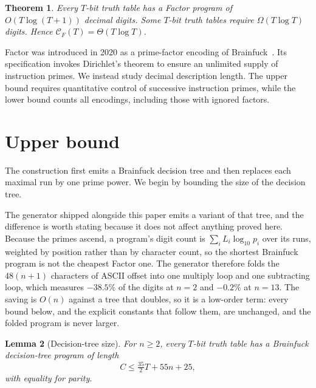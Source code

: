 \documentclass[11pt]{article}
\newtheorem{theorem}{Theorem}[section]
\newtheorem{lemma}[theorem]{Lemma}
\theoremstyle{remark}
\newcommand{\CF}{\mathcal C_F}
\begin{document}
\begin{theorem}\label{thm:main}
Every $T$-bit truth table has a Factor program of
$O(T\log(T+1))$ decimal digits.  Some $T$-bit truth tables require
$\Omega(T\log T)$ digits.  Hence $\CF(T)=\Theta(T\log T)$.
\end{theorem}

Factor was introduced in 2020 as a prime-factor encoding of
Brainfuck~\cite{factor-spec}.  Its specification invokes Dirichlet's theorem
to ensure an unlimited supply of instruction primes.  We instead study
decimal description length.  The upper bound requires quantitative control
of successive instruction primes, while the lower bound counts all encodings,
including those with ignored factors.

\section{Upper bound}

The construction first emits a Brainfuck decision tree and then replaces each
maximal run by one prime power.  We begin by bounding the size of the decision
tree.

The generator shipped alongside this paper emits a variant of that tree, and
the difference is worth stating because it does not affect anything proved
here.  Because the primes ascend, a program's digit count is
$\sum_i L_i\log_{10}p_i$ over its runs, weighted by position rather than by
character count, so the shortest Brainfuck program is not the cheapest Factor
one.  The generator therefore folds the $48(n+1)$ characters of ASCII offset
into one multiply loop and one subtracting loop, which measures $-38.5\%$ of
the digits at $n=2$ and $-0.2\%$ at $n=13$.  The saving is $O(n)$ against a
tree that doubles, so it is a low-order term: every bound below, and the
explicit constants that follow them, are unchanged, and the folded program is
never larger.

\begin{lemma}[Decision-tree size]\label{lem:tree}
For $n\ge2$, every $T$-bit truth table has a Brainfuck decision-tree program
of length
\[
  C\le\tfrac{35}{2}T+55n+25,
\]
with equality for parity.
\end{lemma}
\end{document}

